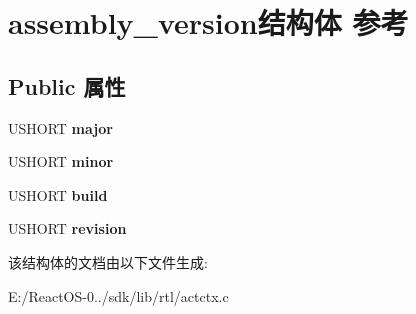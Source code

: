\hypertarget{structassembly__version}{}\section{assembly\+\_\+version结构体 参考}
\label{structassembly__version}
\subsection*{Public 属性}
\begin{DoxyCompactItemize}
\item 
\mbox{\label{structassembly__version_a1b37f601f40b78c11fc7b1b6ef300751}} 
U\+S\+H\+O\+RT {\bfseries major}
\item 
\mbox{\label{structassembly__version_a8efc7ec3172c4897b8325d816ba9f51f}} 
U\+S\+H\+O\+RT {\bfseries minor}
\item 
\mbox{\label{structassembly__version_a7bea0ec74986b5a3d68769f07e019631}} 
U\+S\+H\+O\+RT {\bfseries build}
\item 
\mbox{\label{structassembly__version_a4ad170f93666ba7ed8c08fa6eca970f8}} 
U\+S\+H\+O\+RT {\bfseries revision}
\end{DoxyCompactItemize}


该结构体的文档由以下文件生成\+:\begin{DoxyCompactItemize}
\item 
E\+:/\+React\+O\+S-\/0../sdk/lib/rtl/actctx.\+c\end{DoxyCompactItemize}
